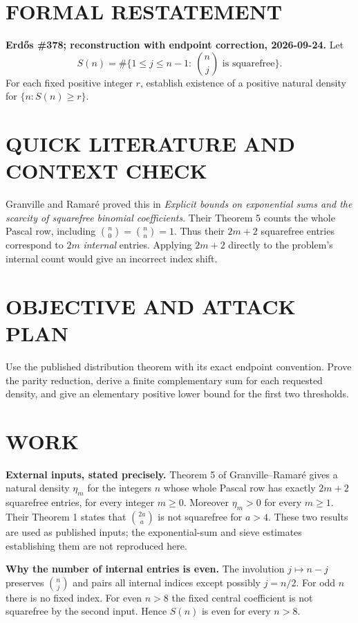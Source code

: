 \section{FORMAL RESTATEMENT}
\textbf{Erd\H{o}s \#378; reconstruction with endpoint correction, 2026-09-24.}
Let
\[
S(n)=\#\{1\leq j\leq n-1:\ \binom nj\text{ is squarefree}\}.
\]
For each fixed positive integer $r$, establish existence of a positive natural density for $\{n:S(n)\geq r\}$.

\section{QUICK LITERATURE AND CONTEXT CHECK}
Granville and Ramar\'e proved this in \emph{Explicit bounds on exponential sums and the scarcity of squarefree binomial coefficients}. Their Theorem 5 counts the whole Pascal row, including $\binom n0=\binom nn=1$. Thus their $2m+2$ squarefree entries correspond to $2m$ \emph{internal} entries. Applying $2m+2$ directly to the problem's internal count would give an incorrect index shift.

\section{OBJECTIVE AND ATTACK PLAN}
Use the published distribution theorem with its exact endpoint convention. Prove the parity reduction, derive a finite complementary sum for each requested density, and give an elementary positive lower bound for the first two thresholds.

\section{WORK}
\textbf{External inputs, stated precisely.} Theorem 5 of Granville--Ramar\'e gives a natural density $\eta_m$ for the integers $n$ whose whole Pascal row has exactly $2m+2$ squarefree entries, for every integer $m\geq0$. Moreover $\eta_m>0$ for every $m\geq1$. Their Theorem 1 states that $\binom{2a}{a}$ is not squarefree for $a>4$. These two results are used as published inputs; the exponential-sum and sieve estimates establishing them are not reproduced here.

\textbf{Why the number of internal entries is even.} The involution $j\mapsto n-j$ preserves $\binom nj$ and pairs all internal indices except possibly $j=n/2$. For odd $n$ there is no fixed index. For even $n>8$ the fixed central coefficient is not squarefree by the second input. Hence $S(n)$ is even for every $n>8$.

